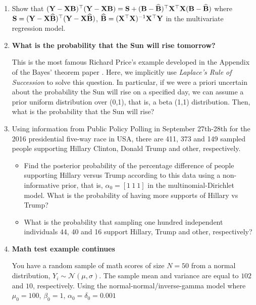 \begin{enumerate}
	\item Show that $({\bf{Y}}-{\bf{X}}{\bf{B}})^{\top}({\bf{Y}}-{\bf{X}}{\bf{B}})={\bf{S}}+({\bf{B}}-\widehat{\bf{B}})^{\top}{\bf{X}}^{\top}{\bf{X}}({\bf{B}}-\widehat{\bf{B}})$ where ${\bf{S}}= ({\bf{Y}}-{\bf{X}}\widehat{\bf{B}})^{\top}({\bf{Y}}-{\bf{X}}\widehat{\bf{B}})$, $\widehat{\bf{B}}= ({\bf{X}}^{\top}{\bf{X}})^{-1}{\bf{X}}^{\top}{\bf{Y}}$ in the multivariate regression model.
	
	\item \textbf{What is the probability that the Sun will rise tomorrow?}
	
	This is the most famous Richard Price's example developed in the Appendix of the Bayes' theorem paper \cite{bayes1763lii}. Here, we implicitly use \textit{Laplace's Rule of Succession} to solve this question. In particular, if we were a priori uncertain about the probability the Sun will rise on a specified day, we can assume a prior uniform distribution over (0,1), that is, a beta (1,1) distribution. Then, what is the probability that the Sun will rise?
	
	
	\item Using information from Public Policy Polling in September 27th-28th for the 2016 presidential five-way race in USA, there are 411, 373 and 149 sampled people supporting Hillary Clinton, Donald Trump and other, respectively. 
	
	\begin{itemize}
		\item Find the posterior probability of the percentage difference of people supporting Hillary versus Trump according to this data using a non-informative prior, that is, $\alpha_0=[1 \ 1 \ 1]$ in the multinomial-Dirichlet model. What is the probability of having more supports of Hillary vs Trump?
		
		\item What is the probability that sampling one hundred independent individuals 44, 40 and 16 support Hillary, Trump and other, respectively?  
	\end{itemize}

\item \textbf{Math test example continues}

You have a random sample of math scores of size $N=50$ from a normal distribution, $Y_i\sim \mathcal{N}(\mu, \sigma)$. The sample mean and variance are equal to $102$ and $10$, respectively. Using the normal-normal/inverse-gamma model where $\mu_0=100$, $\beta_0=1$, $\alpha_0=\delta_0=0.001$


\end{enumerate}
